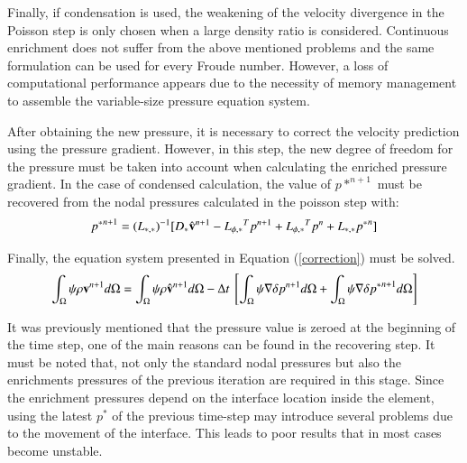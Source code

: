 Finally, if condensation is used, the weakening of the velocity divergence in the Poisson step is only chosen when a large density ratio is considered. Continuous enrichment does not suffer from the above mentioned problems and the same formulation can be used for every Froude number. However, a loss of computational performance appears due to the necessity of memory management to assemble the variable-size pressure equation system.


%

After obtaining the new pressure, it is necessary to correct the velocity prediction using the pressure gradient. However, in this step, the new degree of freedom for the pressure must be taken into account when calculating the enriched pressure gradient. In the case of condensed calculation, the value of $p*^{n+1}$ must be recovered from the nodal pressures calculated in the poisson step with:
\begin{equation}
  {p^*}^{n+1} = {(L_{*,*})}^{-1}[D_* \hat{\mathbf{v}}^{n+1} - {L_{\phi,*}}^Tp^{n+1} + {L_{\phi,*}}^Tp^{n} + L_{*,*}{p^*}^n]
  \label{recovering}
\end{equation}

Finally, the equation system presented in Equation (\ref{correction}) must be solved.
 \begin{equation}
  \int_{\Omega} \psi \rho \vv^{n+1} d\Omega = \int_{\Omega} \psi \rho \hat{\vv}^{n+1} d\Omega - \Delta t \ \left[\int_{\Omega} \psi \nabla \delta p^{n+1} d\Omega + \int_{\Omega} \psi \nabla \delta {p^*}^{n+1} d\Omega \right]
  \label{correction}
 \end{equation}

It was previously mentioned that the pressure value is zeroed at the beginning of the time step, one of the main reasons can be found in the recovering step. It must be noted that, not only the standard nodal pressures but also the enrichments pressures of the previous iteration are required in this stage. Since the enrichment pressures depend on the interface location inside the element, using the latest $p^*$ of the previous time-step may introduce several problems due to the movement of the interface. This leads to poor results that in most cases become unstable.

